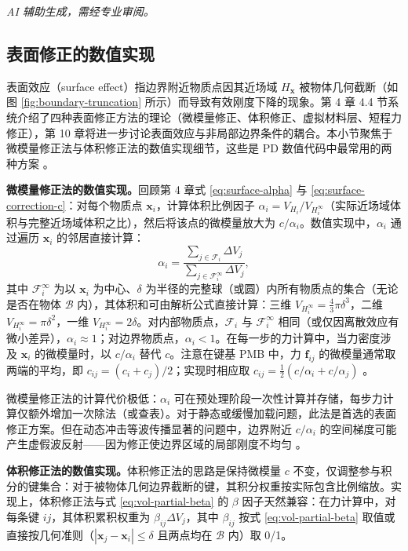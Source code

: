 \emph{AI 辅助生成，需经专业审阅。}

\subsection{表面修正的数值实现}\label{sec:disc-surface-correction}

表面效应（surface effect）指边界附近物质点因其近场域 $H_{\mathbf{x}}$ 被物体几何截断（如图 \ref{fig:boundary-truncation} 所示）而导致有效刚度下降的现象。第 4 章 4.4 节系统介绍了四种表面修正方法的理论（微模量修正、体积修正、虚拟材料层、短程力修正），第 10 章将进一步讨论表面效应与非局部边界条件的耦合。本小节聚焦于微模量修正法与体积修正法的数值实现细节，这些是 PD 数值代码中最常用的两种方案 \cite{LeBobaru2018,MadenciOterkus2014}。

\textbf{微模量修正法的数值实现。}回顾第 4 章式 \eqref{eq:surface-alpha} 与 \eqref{eq:surface-correction-c}：对每个物质点 $\mathbf{x}_i$，计算体积比例因子 $\alpha_i=V_{H_i}/V_{H_i^{\infty}}$（实际近场域体积与完整近场域体积之比），然后将该点的微模量放大为 $c/\alpha_i$。数值实现中，$\alpha_i$ 通过遍历 $\mathbf{x}_i$ 的邻居直接计算：
\begin{equation}
  \alpha_i
  =\frac{\sum_{j\in\mathcal{F}_i}\Delta V_j}
  {\sum_{j\in\mathcal{F}_i^{\infty}}\Delta V_j},
  \label{eq:vol-alpha-numerical}
\end{equation}
其中 $\mathcal{F}_i^{\infty}$ 为以 $\mathbf{x}_i$ 为中心、$\delta$ 为半径的完整球（或圆）内所有物质点的集合（无论是否在物体 $\mathcal{B}$ 内），其体积和可由解析公式直接计算：三维 $V_{H_i^{\infty}}=\frac{4}{3}\pi\delta^3$，二维 $V_{H_i^{\infty}}=\pi\delta^2$，一维 $V_{H_i^{\infty}}=2\delta$。对内部物质点，$\mathcal{F}_i$ 与 $\mathcal{F}_i^{\infty}$ 相同（或仅因离散效应有微小差异），$\alpha_i\approx1$；对边界物质点，$\alpha_i<1$。在每一步的力计算中，当力密度涉及 $\mathbf{x}_i$ 的微模量时，以 $c/\alpha_i$ 替代 $c$。注意在键基 PMB 中，力 $\mathbf{f}_{ij}$ 的微模量通常取两端的平均，即 $c_{ij}=(c_i+c_j)/2$；实现时相应取 $c_{ij}=\frac{1}{2}(c/\alpha_i+c/\alpha_j)$ \cite{LeBobaru2018}。

微模量修正法的计算代价极低：$\alpha_i$ 可在预处理阶段一次性计算并存储，每步力计算仅额外增加一次除法（或查表）。对于静态或缓慢加载问题，此法是首选的表面修正方案。但在动态冲击等波传播显著的问题中，边界附近 $c/\alpha_i$ 的空间梯度可能产生虚假波反射——因为修正使边界区域的局部刚度不均匀 \cite{LeBobaru2018,LeBobaru2018Obj}。

\textbf{体积修正法的数值实现。}体积修正法的思路是保持微模量 $c$ 不变，仅调整参与积分的键集合：对于被物体几何边界截断的键，其积分权重按实际包含比例缩放。实现上，体积修正法与式 \eqref{eq:vol-partial-beta} 的 $\beta$ 因子天然兼容：在力计算中，对每条键 $ij$，其体积累积权重为 $\beta_{ij}\Delta V_j$，其中 $\beta_{ij}$ 按式 \eqref{eq:vol-partial-beta} 取值或直接按几何准则（$|\mathbf{x}_j-\mathbf{x}_i|\le\delta$ 且两点均在 $\mathcal{B}$ 内）取 0/1。

